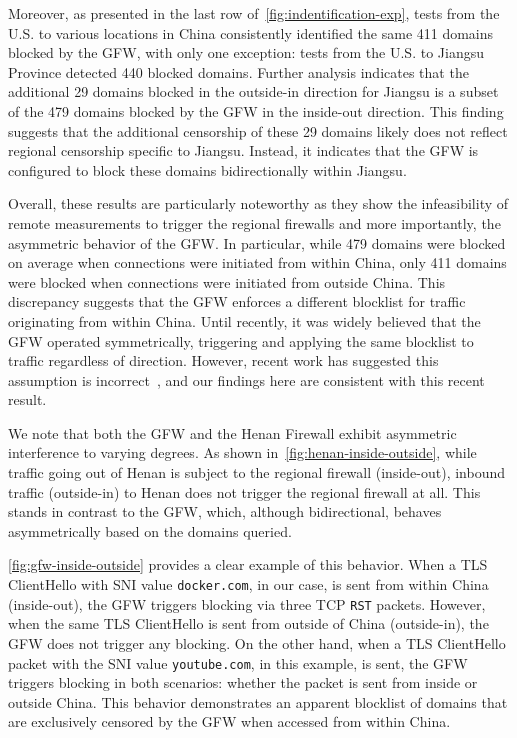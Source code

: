 \documentclass[conference,compsoc]{IEEEtran}
\begin{document}
Moreover, as presented in the last row
of~\autoref{fig:indentification-exp},
tests from the U.S. to various locations in China
consistently identified the same 411 domains blocked by the GFW,
with only one exception:
tests from the U.S. to Jiangsu Province detected 440 blocked domains.
Further analysis indicates that the additional 29 domains blocked in the outside-in direction
for Jiangsu is a subset of the 479 domains blocked by the GFW in the inside-out direction.
This finding suggests that the additional censorship of these 29 domains
likely does not reflect regional censorship specific to Jiangsu.
Instead, it indicates that the GFW is configured to block these domains bidirectionally within Jiangsu.

Overall, these results are particularly noteworthy as they show the
infeasibility of remote measurements to trigger the regional firewalls and
more importantly, the asymmetric behavior of the GFW.
In particular, while 479 domains were blocked on average when
connections were initiated from within China, only 411 domains
were blocked when connections were initiated from outside China.
This discrepancy suggests that the GFW enforces a different blocklist
for traffic originating from within China. Until recently,
it was widely believed that the GFW operated symmetrically,
triggering and applying the same blocklist to traffic regardless of direction.
However, recent work has suggested this assumption is incorrect~\cite{Hoang2024a},
and our findings here are consistent with this recent result.


We note that both the GFW and the Henan Firewall exhibit asymmetric interference to varying degrees. As shown in~\autoref{fig:henan-inside-outside}, while traffic going out of Henan is subject to the regional firewall (inside-out),
inbound traffic (outside-in) to Henan does not trigger the regional firewall at all. This stands in contrast to the GFW, which, although bidirectional, behaves asymmetrically based on the domains queried.

\autoref{fig:gfw-inside-outside} provides a clear example of this behavior. When a TLS ClientHello with SNI value \texttt{docker.com}, in our case, is sent from within China (inside-out), the GFW triggers blocking via three TCP \texttt{RST} packets. However, when the same TLS ClientHello is sent from outside of China (outside-in), the GFW does not trigger any blocking. On the other hand, when a TLS ClientHello packet with the SNI value \texttt{youtube.com}, in this example, is sent, the GFW triggers blocking in both scenarios: whether the packet is sent from inside or outside China. This behavior demonstrates an apparent blocklist of domains that are exclusively censored by the GFW when accessed from within China.
\end{document}
